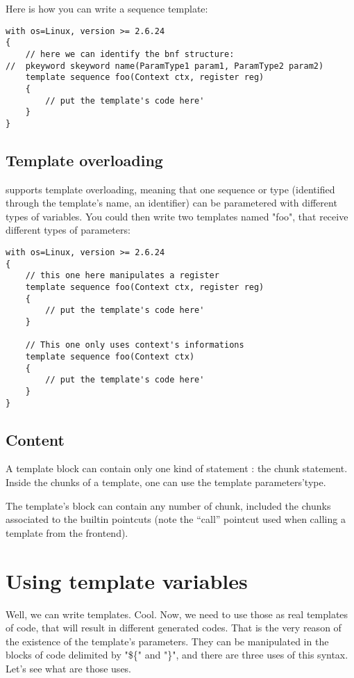 \documentclass[american]{rtxreport}
\begin{document}
Here is how you can write a sequence template:
\begin{lstlisting}
with os=Linux, version >= 2.6.24
{
    // here we can identify the bnf structure: 
//  pkeyword skeyword name(ParamType1 param1, ParamType2 param2)
    template sequence foo(Context ctx, register reg)
    {
        // put the template's code here'
    }
}
\end{lstlisting}

\section{Template overloading}

\rtx supports template overloading, meaning that one sequence or type
(identified through the template's name, an identifier) can be parametered with
different types of variables. You could then write two templates named "foo",
that receive different types of parameters:

\begin{lstlisting}
with os=Linux, version >= 2.6.24
{
    // this one here manipulates a register
    template sequence foo(Context ctx, register reg)
    {
        // put the template's code here'
    }

    // This one only uses context's informations
    template sequence foo(Context ctx)
    {
        // put the template's code here'
    }
}
\end{lstlisting}

\section{Content}

A template block can contain only one kind of statement : the chunk statement.
Inside the chunks of a template, one can use the template parameters'type.

The template's block can contain any number of chunk, included the chunks
associated to the builtin pointcuts (note the ``call'' pointcut used when
calling a template from the frontend).


\chapter{Using template variables}

Well, we can write templates. Cool. Now, we need to use those as real templates
of code, that will result in different generated codes. That is the very reason
of the existence of the template's parameters. They can be manipulated in the
blocks of code delimited by "\$\{" and "\}", and there are three uses of this
syntax. Let's see what are those uses.
\end{document}
